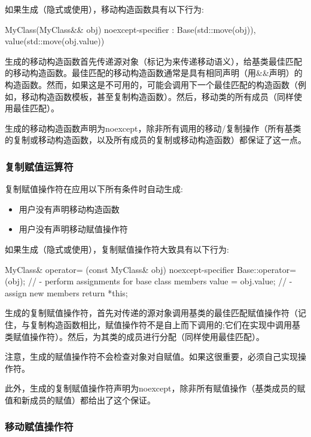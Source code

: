 如果生成（隐式或使用），移动构造函数具有以下行为:

\begin{cppcode}
MyClass(MyClass&& obj) noexcept-specifier
: Base(std::move(obj)), value(std::move(obj.value)) {
}
\end{cppcode}

生成的移动构造函数首先传递源对象（标记为来传递移动语义），给基类最佳匹配的移动构造函数。最佳匹配的移动构造函数通常是具有相同声明（用\&\&声明）的构造函数。然而，如果这是不可用的，可能会调用下一个最佳匹配的构造函数（例如，移动构造函数模板，甚至复制构造函数）。然后，移动类的所有成员（同样使用最佳匹配）。

生成的移动构造函数声明为noexcept，除非所有调用的移动/复制操作（所有基类的复制或移动构造函数，以及所有成员的复制或移动构造函数）都保证了这一点。

\subsubsection{复制赋值运算符}

复制赋值操作符在应用以下所有条件时自动生成:

\begin{itemize}
	\item 用户没有声明移动构造函数
	\item 用户没有声明移动赋值操作符
\end{itemize}

如果生成（隐式或使用），复制赋值操作符大致具有以下行为:

\begin{cppcode}
MyClass& operator= (const MyClass& obj) noexcept-specifier {
	Base::operator=(obj); // - perform assignments for base class members
	value = obj.value; // - assign new members
	return *this;
}
\end{cppcode}

生成的复制赋值操作符，首先对传递的源对象调用基类的最佳匹配赋值操作符（记住，与复制构造函数相比，赋值操作符不是自上而下调用的;它们在实现中调用基类赋值操作符）。然后，为其类的成员进行分配（同样使用最佳匹配）。

注意，生成的赋值操作符不会检查对象对自赋值。如果这很重要，必须自己实现操作符。

此外，生成的复制赋值操作符声明为noexcept，除非所有赋值操作（基类成员的赋值和新成员的赋值）都给出了这个保证。

\subsubsection{移动赋值操作符}

